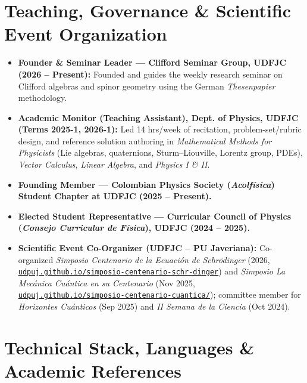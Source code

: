 \documentclass[10pt,a4paper]{article}
\begin{document}
\section{Teaching, Governance \& Scientific Event Organization}

\begin{itemize}
  \item \textbf{Founder \& Seminar Leader --- Clifford Seminar Group, UDFJC (2026 -- Present):} Founded and guides the weekly research seminar on Clifford algebras and spinor geometry using the German \textit{Thesenpapier} methodology.
  \item \textbf{Academic Monitor (Teaching Assistant), Dept. of Physics, UDFJC (Terms 2025-1, 2026-1):} Led 14 hrs/week of recitation, problem-set/rubric design, and reference solution authoring in \textit{Mathematical Methods for Physicists} (Lie algebras, quaternions, Sturm--Liouville, Lorentz group, PDEs), \textit{Vector Calculus}, \textit{Linear Algebra}, and \textit{Physics I \& II}.
  \item \textbf{Founding Member --- Colombian Physics Society (\textit{Acolf\'isica}) Student Chapter at UDFJC (2025 -- Present).}
  \item \textbf{Elected Student Representative --- Curricular Council of Physics (\textit{Consejo Curricular de F\'isica}), UDFJC (2024 -- 2025).}
  \item \textbf{Scientific Event Co-Organizer (UDFJC -- PU Javeriana):} Co-organized \textit{Simposio Centenario de la Ecuaci\'on de Schr\"odinger} (2026, \href{https://udpuj.github.io/simposio-centenario-schr-dinger}{\texttt{udpuj.github.io/simposio-centenario-schr-dinger}}) and \textit{Simposio La Mec\'anica Cu\'antica en su Centenario} (Nov 2025, \href{https://udpuj.github.io/simposio-centenario-cuantica/}{\texttt{udpuj.github.io/simposio-centenario-cuantica/}}); committee member for \textit{Horizontes Cu\'anticos} (Sep 2025) and \textit{II Semana de la Ciencia} (Oct 2024).
\end{itemize}

\section{Technical Stack, Languages \& Academic References}
\end{document}
